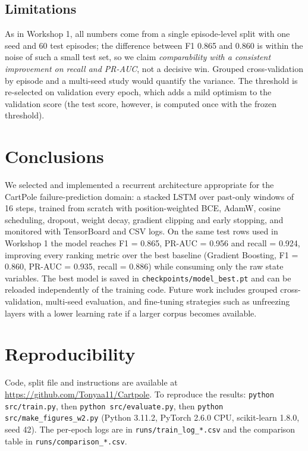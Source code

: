 \documentclass[conference]{IEEEtran}
\begin{document}
\subsection{Limitations}
As in Workshop 1, all numbers come from a single episode-level split with one
seed and 60 test episodes; the difference between F1 0.865 and 0.860 is within
the noise of such a small test set, so we claim \emph{comparability with a
consistent improvement on recall and PR-AUC}, not a decisive win. Grouped
cross-validation by episode and a multi-seed study would quantify the
variance. The threshold is re-selected on validation every epoch, which adds
a mild optimism to the validation score (the test score, however, is computed
once with the frozen threshold).

\section{Conclusions}
We selected and implemented a recurrent architecture appropriate for the
CartPole failure-prediction domain: a stacked LSTM over past-only windows of
16 steps, trained from scratch with position-weighted BCE, AdamW, cosine
scheduling, dropout, weight decay, gradient clipping and early stopping, and
monitored with TensorBoard and CSV logs. On the same test rows used in
Workshop 1 the model reaches F1 = 0.865, PR-AUC = 0.956 and recall = 0.924,
improving every ranking metric over the best baseline (Gradient Boosting,
F1 = 0.860, PR-AUC = 0.935, recall = 0.886) while consuming only the raw
state variables. The best model is saved in
\texttt{checkpoints/model\_best.pt} and can be reloaded independently of the
training code. Future work includes grouped cross-validation, multi-seed
evaluation, and fine-tuning strategies such as unfreezing layers with a lower
learning rate if a larger corpus becomes available.

\section*{Reproducibility}
Code, split file and instructions are available at
\url{https://github.com/Tonyaa11/Cartpole}. To reproduce the results:
\texttt{python src/train.py}, then \texttt{python src/evaluate.py}, then
\texttt{python src/make\_figures\_w2.py} (Python 3.11.2, PyTorch 2.6.0 CPU,
scikit-learn 1.8.0, seed 42). The per-epoch logs are in
\texttt{runs/train\_log\_*.csv} and the comparison table in
\texttt{runs/comparison\_*.csv}.
\end{document}
